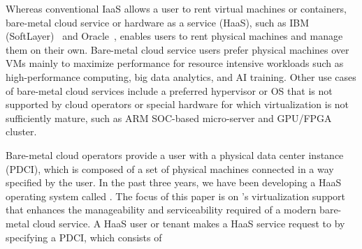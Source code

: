 Whereas conventional IaaS allows a user to rent virtual machines or containers, 
bare-metal cloud service or hardware as a service (HaaS), 
such as  IBM (SoftLayer)~\cite{softlayer} and Oracle~\cite{oracle}, enables users to 
rent physical machines and manage them on their own. 
Bare-metal cloud service users prefer physical machines over VMs mainly
to maximize performance for resource intensive workloads 
such as high-performance computing, big data analytics, and AI training.
Other use cases of bare-metal cloud services include a preferred hypervisor 
or OS that is not supported by cloud operators or special hardware for which virtualization 
is not sufficiently mature, such as ARM SOC-based micro-server and GPU/FPGA cluster.

Bare-metal cloud operators provide a user with a physical data center instance (PDCI), which is 
composed of a set of physical machines connected in a way specified by the user. 
In the past three years, we have been developing a HaaS operating system 
called 
\sna.  
The focus of this paper is on \sna's virtualization support that enhances the manageability and serviceability required of a modern bare-metal cloud service. 
A HaaS user or tenant makes a HaaS service request to \na by specifying a PDCI, which consists of 

